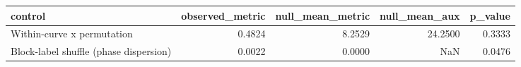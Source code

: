 \begin{tabular}{lrrrr}
\toprule
control & observed_metric & null_mean_metric & null_mean_aux & p_value \\
\midrule
Within-curve x permutation & 0.4824 & 8.2529 & 24.2500 & 0.3333 \\
Block-label shuffle (phase dispersion) & 0.0022 & 0.0000 & NaN & 0.0476 \\
\bottomrule
\end{tabular}
